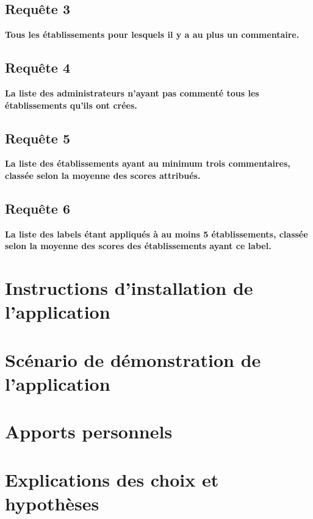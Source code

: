 \documentclass[a4paper,10pt]{article}
\begin{document}
\subsection{Requête 3}

\textbf{Tous les établissements pour lesquels il y a au plus un commentaire.}

\subsection{Requête 4}

\textbf{La liste des administrateurs n’ayant pas commenté tous les établissements qu’ils ont crées.}

\subsection{Requête 5}

\textbf{La liste des établissements ayant au minimum trois commentaires, classée selon la moyenne des scores attribués.}

\subsection{Requête 6}

\textbf{La liste des labels étant appliqués à au moins 5 établissements, classée selon la moyenne des scores des établissements ayant ce label.}

\section{Instructions d'installation de l'application}

\section{Scénario de démonstration de l'application}

\section{Apports personnels}

\section{Explications des choix et hypothèses}
\end{document}
